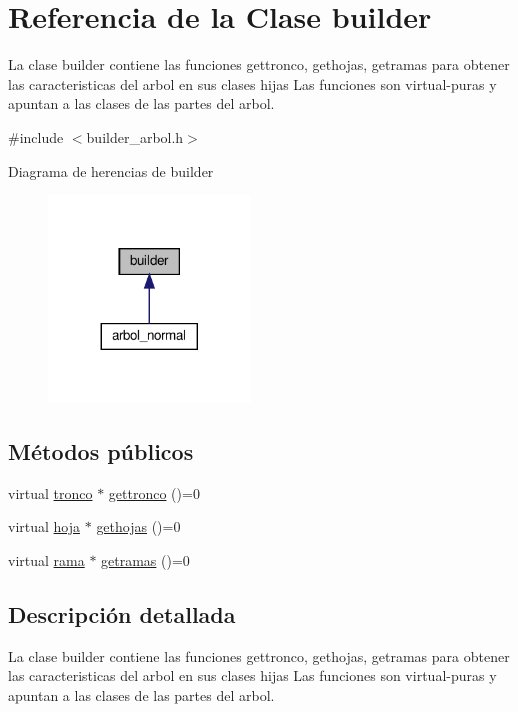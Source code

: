 \hypertarget{classbuilder}{}\section{Referencia de la Clase builder}
\label{classbuilder}


La clase builder contiene las funciones gettronco, gethojas, getramas para obtener las caracteristicas del arbol en sus clases hijas  Las funciones son virtual-\/puras y apuntan a las clases de las partes del arbol.  




{\ttfamily \#include $<$builder\+\_\+arbol.\+h$>$}



Diagrama de herencias de builder
\nopagebreak
\begin{figure}[H]
\begin{center}
\leavevmode
\includegraphics[width=152pt]{classbuilder__inherit__graph}
\end{center}
\end{figure}
\subsection*{Métodos públicos}
\begin{DoxyCompactItemize}
\item 
virtual \hyperlink{classtronco}{tronco} $\ast$ \hyperlink{classbuilder_af81e62bdfc53bbdad5f1d8edc4b46ecd}{gettronco} ()=0
\item 
virtual \hyperlink{classhoja}{hoja} $\ast$ \hyperlink{classbuilder_a03de42e8ec33a22c3635a6e946061b70}{gethojas} ()=0
\item 
virtual \hyperlink{classrama}{rama} $\ast$ \hyperlink{classbuilder_a7b811cc1a2cffe9f3601faab0d85627b}{getramas} ()=0
\end{DoxyCompactItemize}


\subsection{Descripción detallada}
La clase builder contiene las funciones gettronco, gethojas, getramas para obtener las caracteristicas del arbol en sus clases hijas  Las funciones son virtual-\/puras y apuntan a las clases de las partes del arbol. 


